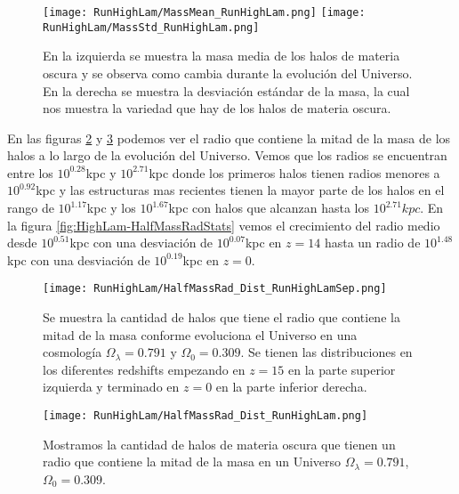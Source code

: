\begin{figure}[H]
    \centering
    \texttt{[image: RunHighLam/MassMean\_RunHighLam.png]}
    \texttt{[image: RunHighLam/MassStd\_RunHighLam.png]}
    \caption[Media y desviación estándar de la distribución de masa]{\footnotesize En la izquierda se muestra la masa media de los halos de materia oscura y se observa como cambia durante la evolución del Universo. En la derecha se muestra la desviación estándar de la masa, la cual nos muestra la variedad que hay de los halos de materia oscura.}
    \label{fig:HighLam-MassStats}
\end{figure}

En las figuras \ref{fig:HighLam-HalfMassRadDistSep} y \ref{fig:HighLam-HalfMassRadDist} podemos ver el radio que contiene la mitad de la masa de los halos a lo largo de la evolución del Universo. Vemos que los radios se encuentran entre los $10^{0.28}$kpc y $10^{2.71}$kpc donde los primeros halos tienen radios menores a $10^{0.92}$kpc y las estructuras mas recientes tienen la mayor parte de los halos en el rango de $10^{1.17}$kpc y los $10^{1.67}$kpc con halos que alcanzan hasta los $10^{2.71}kpc$. En la figura \ref{fig:HighLam-HalfMassRadStats} vemos el crecimiento del radio medio desde $10^{0.51}$kpc con una desviación de $10^{0.07}$kpc en $z=14$ hasta un radio de $10^{1.48}$kpc con una desviación de $10^{0.19}$kpc en $z=0$.

\begin{figure}[H]
    \centering
    \texttt{[image: RunHighLam/HalfMassRad\_Dist\_RunHighLamSep.png]}
    \caption[Radio que contiene la mitad de la masa]{\footnotesize Se muestra la cantidad de halos que tiene el radio que contiene la mitad de la masa conforme evoluciona el Universo en una cosmología $\Omega_\lambda = 0.791$ y $\Omega_0 = 0.309$. Se tienen las distribuciones en los diferentes redshifts empezando en $z=15$ en la parte superior izquierda y terminado en $z=0$ en la parte inferior derecha.}
    \label{fig:HighLam-HalfMassRadDistSep}
\end{figure}

\begin{figure}[H]
    \centering
    \texttt{[image: RunHighLam/HalfMassRad\_Dist\_RunHighLam.png]}
    \caption[Distribución del radio que contiene la mitad de la masa]{\footnotesize Mostramos la cantidad de halos de materia oscura que tienen un radio que contiene la mitad de la masa en un Universo $\Omega_\lambda = 0.791$, $\Omega_0 = 0.309$.}
    \label{fig:HighLam-HalfMassRadDist}
\end{figure}

